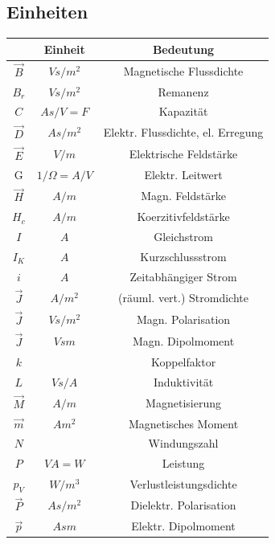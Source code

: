 \documentclass[a4paper, 6pt, landscape]{scrartcl}
\begin{document}
\begin{multicols*}{4}
				\subsection{Einheiten}
				\vspace{-0.1cm}
				\begin{tabular}{|c|c|c|}
				\hline
				\textbf{} & \textbf{Einheit} & \textbf{Bedeutung} \\
				\hline
				$\vec{B}$ & $Vs/m^2$ & Magnetische Flussdichte \\
				\hline
				$B_r$ & $Vs/m^2$ & Remanenz \\
				\hline
				$C$ & $As/V=F$ & Kapazität \\
				\hline
				$\vec{D}$ & $As/m^2$ & Elektr. Flussdichte, el. Erregung \\
				\hline
				$\vec{E}$ & $V/m$ & Elektrische Feldstärke \\
				\hline
				G & $1/\Omega=A/V$ & Elektr. Leitwert \\
				\hline
				$\vec{H}$ & $A/m$ & Magn. Feldstärke \\
				\hline 
				$H_c$ & $A/m$ & Koerzitivfeldstärke \\
				\hline
				$I$ & $A$ & Gleichstrom \\
				\hline
			    $I_K$ & $A$ & Kurzschlussstrom \\
				\hline
				$i$ & $A$ & Zeitabhängiger Strom \\
				\hline
				$\vec{J}$ & $A/m^2$ & (räuml. vert.) Stromdichte \\
				\hline
				$\vec{J}$ & $Vs/m^2$ & Magn. Polarisation \\
				\hline
				$\vec{J}$ & $Vsm$ & Magn. Dipolmoment \\
				\hline
				$k$ & & Koppelfaktor \\
				\hline
				$L$ & $Vs/A$ & Induktivität \\
				\hline
				$\vec{M}$ & $A/m$ & Magnetisierung \\
				\hline
				$\vec{m}$ & $Am^2$ & Magnetisches Moment \\
				\hline
				$N$ & & Windungszahl \\
				\hline
				$P$ & $VA=W$ & Leistung \\
				\hline
				$p_V$ & $W/m^3$ & Verlustleistungsdichte \\
				\hline
				$\vec{P}$ & $As/m^2$ & Dielektr. Polarisation \\
				\hline
				$\vec{p}$ & $Asm$ & Elektr. Dipolmoment \\
				\hline

\end{tabular}
\end{multicols*}
\end{document}
